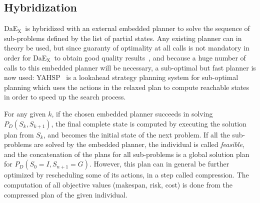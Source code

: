 \documentclass[a4paper,10pt]{article}
\def\DAEX{{\sc DaE$_{\text{X}}$}}
\begin{document}
\subsection{Hybridization}
\DAEX\ is hybridized with an external embedded planner to solve the sequence of sub-problems defined by the list of partial states.
Any existing planner can in theory be used, but since guaranty of optimality at all calls is not mandatory in order for \DAEX\ to obtain good quality results~\cite{Bibai2010}, and because a huge number of calls to this embedded planner will be necessary, a sub-optimal but fast planner is now used: YAHSP~\cite{Vidal2004} is a lookahead 
strategy planning system for sub-optimal planning which uses the  actions in the relaxed plan to compute reachable states in order to speed up the search process.

For any given $k$, if the chosen embedded planner succeeds in solving $ P_{D} (S_k, S_{k+1} )$, the final complete state is computed by executing the solution plan
from $S_k$, and becomes the initial state of the next problem. If all the sub-problems are solved by the  embedded planner, 
the individual is called \textit{feasible}, and the concatenation of the plans for all sub-problems  is a
global solution plan for $P_{D} (S_{0} = I, S_{n+1} = G)$. However, this plan can in general be further optimized by rescheduling some of its actions, in a step called
compression. The computation of all objective values (makespan, risk, cost) is done from the compressed plan of the given individual.
\end{document}
